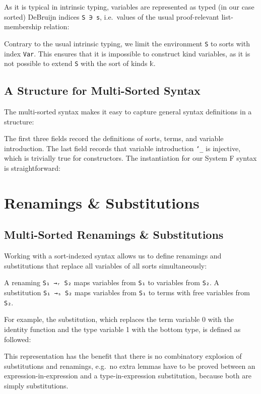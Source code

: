 \documentclass[sigplan,10pt]{acmart}
\newenvironment{LibCode*}{%
  \begin{tcolorbox}[%
    colframe=white,%
    boxrule=0.0pt,%
    top=2.5pt,%
    left=2.5pt,%
    bottom=2.5pt,%
    right=2.5pt,%
    boxsep=0pt%
  ]\vspace{-0.2\baselineskip}%
}{%
  \vspace{-1\baselineskip}%
  \end{tcolorbox}%
}
\newenvironment{ExampleCode*}{%
  \begin{tcolorbox}[%
    colframe=white,%
    colback=yellow!5,%
    boxrule=0.0pt,%
    top=2.5pt,%
    left=2.5pt,%
    bottom=2.5pt,%
    right=2.5pt,%
    boxsep=0pt%
  ]\vspace{-0.2\baselineskip}%
}{%
  \vspace{-1\baselineskip}%
  \end{tcolorbox}%
}
\newcommand*\LibCode[1]{\begin{LibCode*}{#1}\end{LibCode*}}
\newcommand*\AppCode[1]{{#1}}
\newcommand*\ExampleCode[1]{\begin{ExampleCode*}{#1}\end{ExampleCode*}}
\begin{document}
  As it is typical in intrinsic typing, variables are represented as
  typed (in our case sorted) DeBruijn indices \texttt{S~∋~s}, i.e.\
  values of the usual proof-relevant list-membership relation:
  \LibCode\KVariables

  Contrary to the usual intrinsic typing, we limit the environment
  \texttt{S} to sorts with index \texttt{Var}.
  This ensures that it is impossible to construct kind variables, as
  it is not possible to extend \texttt{S} with the sort of kinds
  \texttt{𝕜}.

  \subsection{A Structure for Multi-Sorted Syntax}
  The multi-sorted syntax makes it easy to capture general syntax definitions
  in a structure:
  \LibCode\KTerms
  The first three fields record the definitions of sorts, terms, and variable introduction.
  The last field records that variable introduction
  \texttt{`\_} is injective, which is trivially true for
  constructors. The instantiation for our System F syntax is
  straightforward:
  \AppCode\FTerms

  \section{Renamings \& Substitutions}
  \subsection{Multi-Sorted Renamings \& Substitutions}
  Working with a sort-indexed syntax allows us to define renamings and substitutions
  that replace all variables of all sorts simultaneously:

  \ExampleCode\FExampleSubRen

  A renaming \texttt{S₁ →ᵣ S₂} maps variables from \texttt{S₁} to
  variables from \texttt{S₂}.
  A substitution \texttt{S₁ →ₛ S₂} maps variables from \texttt{S₁} to
  terms with free variables from \texttt{S₂}.

  For example, the substitution, which replaces the term variable 0 with the
  identity function and the type variable 1 with the bottom type, is defined
  as followed:
  \ExampleCode\FExampleSub

  This representation has the benefit that there is no combinatory
  explosion of substitutions and renamings, e.g.\ no extra lemmas have to be
  proved between an expression-in-expression and a type-in-expression
  substitution, because both are simply substitutions.
\end{document}
